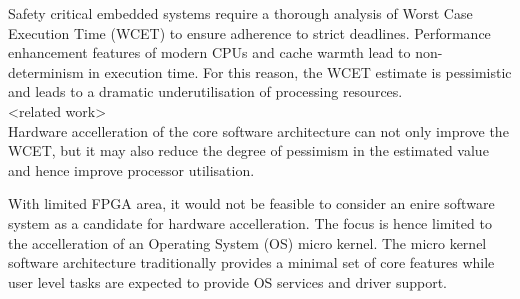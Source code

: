 \documentclass[10pt]{article}
\begin{document}
\maketitle





Safety critical embedded systems require a thorough analysis of Worst Case Execution Time (WCET)
to ensure adherence to strict deadlines. Performance enhancement features of modern
CPUs and cache warmth lead to non-determinism in execution time. For this reason, the WCET estimate
is pessimistic and leads to a dramatic underutilisation of processing resources.
\\


<related work>
\\

Hardware accelleration of the core software architecture can not only improve the WCET, but it may
also reduce the degree of pessimism in the estimated value and hence improve processor utilisation.

With limited FPGA area, it would not be feasible to consider an enire software system as a candidate
for hardware accelleration. The focus is hence limited to the accelleration of an Operating System (OS)
micro kernel. The micro kernel software architecture traditionally provides a minimal set of core
features while user level tasks are expected to provide OS services and driver support.
\end{document}
